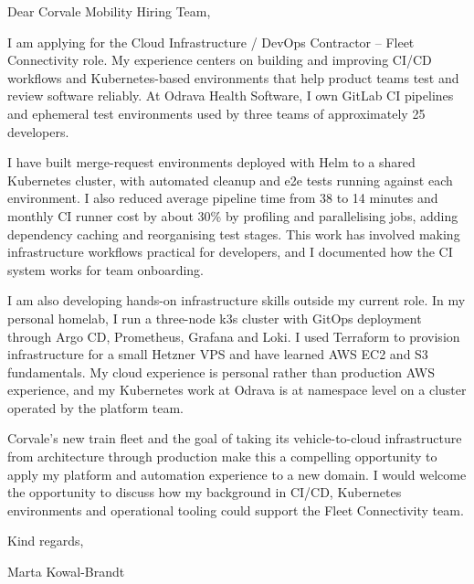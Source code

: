 \documentclass[11pt,a4paper]{article}
\begin{document}
Dear Corvale Mobility Hiring Team,

I am applying for the Cloud Infrastructure / DevOps Contractor – Fleet Connectivity role. My experience centers on building and improving CI/CD workflows and Kubernetes-based environments that help product teams test and review software reliably. At Odrava Health Software, I own GitLab CI pipelines and ephemeral test environments used by three teams of approximately 25 developers.

I have built merge-request environments deployed with Helm to a shared Kubernetes cluster, with automated cleanup and e2e tests running against each environment. I also reduced average pipeline time from 38 to 14 minutes and monthly CI runner cost by about 30\% by profiling and parallelising jobs, adding dependency caching and reorganising test stages. This work has involved making infrastructure workflows practical for developers, and I documented how the CI system works for team onboarding.

I am also developing hands-on infrastructure skills outside my current role. In my personal homelab, I run a three-node k3s cluster with GitOps deployment through Argo CD, Prometheus, Grafana and Loki. I used Terraform to provision infrastructure for a small Hetzner VPS and have learned AWS EC2 and S3 fundamentals. My cloud experience is personal rather than production AWS experience, and my Kubernetes work at Odrava is at namespace level on a cluster operated by the platform team.

Corvale’s new train fleet and the goal of taking its vehicle-to-cloud infrastructure from architecture through production make this a compelling opportunity to apply my platform and automation experience to a new domain. I would welcome the opportunity to discuss how my background in CI/CD, Kubernetes environments and operational tooling could support the Fleet Connectivity team.

Kind regards,

Marta Kowal-Brandt
\end{document}
